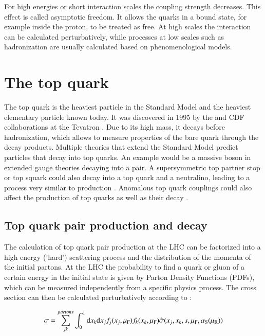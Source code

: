 For high energies or short interaction scales the coupling strength decreases. This effect is called asymptotic freedom. It allows the quarks in a bound state, for example inside the proton, to be treated as free.
At high scales the interaction can be calculated perturbatively, while processes at low scales such as hadronization are usually calculated based on phenomenological models.


\section{The top quark}
\label{sec:theo_top}

The top quark is the heaviest particle in the Standard Model and the heaviest elementary particle known today. It was discovered in 1995 by the \DZERO and CDF collaborations at the Tevatron \cite{PhysRevLett.74.2626,PhysRevLett.74.2632}. Due to its high mass, it decays before hadronization, which allows to measure properties of the bare quark through the decay products. Multiple theories that extend the Standard Model predict particles that decay into top quarks. An example would be a massive \zp boson in extended gauge theories \cite{PhysRevD.63.035006,ROSNER1996113} decaying into a \ttbar pair. A supersymmetric top partner stop or top squark could also decay into a top quark and a neutralino, leading
to a process very similar to \ttbar production \cite{NILLES19841,FARRAR1978575}. Anomalous top quark couplings could also affect the production of top quarks as well as their decay \cite{PhysRevD.91.114010,PhysRevD.82.114008,PhysRevD.80.114017}.

\subsection{Top quark pair production and decay}
\label{sec:theo_prod}

The calculation of top quark pair production at the LHC can be factorized into a high energy ('hard') scattering process and the distribution of the momenta of the initial partons.
At the LHC the probability to find a quark or gluon of a certain energy in the initial state is given by Parton Density Functions (PDFs), which can be measured independently from a specific physics process.
The cross section can then be calculated perturbatively according to \cite{Husemann:2017eka}: 

\begin{equation}
\sigma = \sum_{jk}^{partons} \int_0^1 \mathrm{d}x_k\mathrm{d}x_j f_j(x_j,\mu_\mathrm{F}) f_k(x_k,\mu_\mathrm{F}) \hat{\sigma}(x_j,x_k,s,\mu_\mathrm{F},\alpha_\mathrm{S}(\mu_\mathrm{R}))
\end{equation}


